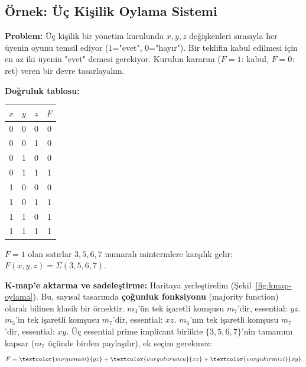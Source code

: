 \subsection{Örnek: Üç Kişilik Oylama Sistemi}\label{sec:donanim-ornek-oylama}
\begin{ornek}\label{orn:oylama}
\textbf{Problem:} Üç kişilik bir yönetim kurulunda $x,y,z$ değişkenleri sırasıyla her
üyenin oyunu temsil ediyor ($1$="evet", $0$="hayır"). Bir teklifin kabul edilmesi için
en az iki üyenin "evet" demesi gerekiyor. Kurulun kararını ($F=1$: kabul, $F=0$: ret)
veren bir devre tasarlayalım.

\textbf{Doğruluk tablosu:}
\begin{center}
\begin{tabular}{ccc|c}
\toprule
$x$&$y$&$z$&$F$\\
\midrule
0&0&0&0\\
0&0&1&0\\
0&1&0&0\\
0&1&1&1\\
1&0&0&0\\
1&0&1&1\\
1&1&0&1\\
1&1&1&1\\
\bottomrule
\end{tabular}
\end{center}
$F=1$ olan satırlar $3,5,6,7$ numaralı mintermlere karşılık gelir:
$F(x,y,z)=\Sigma(3,5,6,7)$.

\textbf{K-map'e aktarma ve sadeleştirme:} Haritaya yerleştirelim (Şekil~\ref{fig:kmap-oylama}).
Bu, sayısal tasarımda \textbf{çoğunluk fonksiyonu} (majority function) olarak bilinen
klasik bir örnektir. $m_3$'ün tek işaretli komşusu $m_7$'dir, essential: $yz$. $m_5$'in tek
işaretli komşusu $m_7$'dir, essential: $xz$. $m_6$'nın tek işaretli komşusu $m_7$'dir,
essential: $xy$. Üç essential prime implicant birlikte $\{3,5,6,7\}$'nin tamamını kapsar
($m_7$ üçünde birden paylaşılır), ek seçim gerekmez:
\[
F = \textcolor{vurgumavi}{yz} + \textcolor{vurguturuncu}{xz} + \textcolor{vurgukirmizi}{xy}
\]


\end{ornek}
